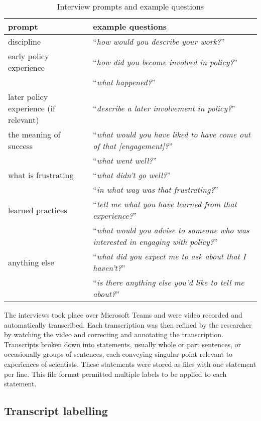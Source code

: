 \begin{table}[!ht]
    \footnotesize
    \caption{Interview prompts and example questions}\label{tab:metinterview}
    \begin{tabular}{L{.4\linewidth}L{.6\linewidth}}  \hline
    \textbf{prompt} & \textbf{example questions} \\ \hline \hline
    discipline & ``\textit{how would you describe your work?}'' \rule[-2ex]{0pt}{6ex}\\
    early policy experience & ``\textit{how did you become involved in policy?}'' \\
     & ``\textit{what happened?}'' \\[2ex]
    later policy experience (if relevant) & ``\textit{describe a later involvement in policy?}'' \\
    the meaning of success & ``\textit{what would you have liked to have come out of that [engagement]?}''\\
     & ``\textit{what went well?}'' \\[2ex]
    what is frustrating & ``\textit{what didn't go well?}'' \\
     & ``\textit{in what way was that frustrating?}''\\[2ex]
    learned practices  & ``\textit{tell me what you have learned from that experience?}'' \\
     & ``\textit{what would you advise to someone who was interested in engaging with policy?}''\\[2ex]
    anything else & ``\textit{what did you expect me to ask about that I haven't?}'' \\
     & ``\textit{is there anything else you'd like to tell me about?}'' \\[2ex] \hline
    \end{tabular}
\end{table}

The interviews took place over Microsoft Teams and were video recorded and automatically transcribed. Each transcription was then refined by the researcher by watching the video and correcting and annotating the transcription. Transcripts broken down into statements, usually whole or part sentences, or occasionally groups of sentences, each conveying singular point relevant to experiences of scientists. These statements were stored as \CSV{} files with one statement per line. This file format permitted multiple labels to be applied to each statement.
\subsection{Transcript labelling}\label{sec:metlabelling}

